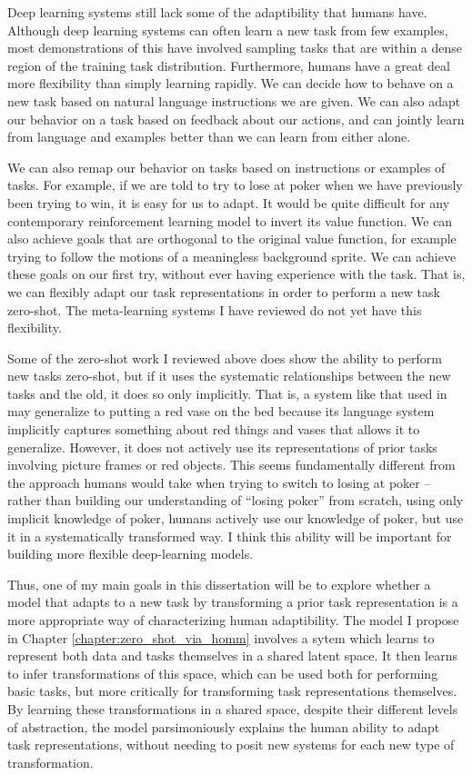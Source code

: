 Deep learning systems still lack some of the adaptibility that humans have. Although deep learning systems can often learn a new task from few examples, most demonstrations of this have involved sampling tasks that are within a dense region of the training task distribution. Furthermore, humans have a great deal more flexibility than simply learning rapidly. We can decide how to behave on a new task based on natural language instructions we are given. We can also adapt our behavior on a task based on feedback about our actions, and can jointly learn from language and examples better than we can learn from either alone. \par
We can also remap our behavior on tasks based on instructions or examples of tasks. For example, if we are told to try to lose at poker when we have previously been trying to win, it is easy for us to adapt. It would be quite difficult for any contemporary reinforcement learning model to invert its value function. We can also achieve goals that are orthogonal to the original value function, for example trying to follow the motions of a meaningless background sprite. We can achieve these goals on our first try, without ever having experience with the task. That is, we can flexibly adapt our task representations in order to perform a new task zero-shot. The meta-learning systems I have reviewed do not yet have this flexibility. \par
Some of the zero-shot work I reviewed above does show the ability to perform new tasks zero-shot, but if it uses the systematic relationships between the new tasks and the old, it does so only implicitly. That is, a system like that used in \citet{Hill2019a} may generalize to putting a red vase on the bed because its language system implicitly captures something about red things and vases that allows it to generalize. However, it does not actively use its representations of prior tasks involving picture frames or red objects. This seems fundamentally different from the approach humans would take when trying to switch to losing at poker -- rather than building our understanding of ``losing poker'' from scratch, using only implicit knowledge of poker, humans actively use our knowledge of poker, but use it in a systematically transformed way. I think this ability will be important for building more flexible deep-learning models. \par
Thus, one of my main goals in this dissertation will be to explore whether a model that adapts to a new task by transforming a prior task representation is a more appropriate way of characterizing human adaptibility. The model I propose in Chapter \ref{chapter:zero_shot_via_homm} involves a sytem which learns to represent both data and tasks themselves in a shared latent space. It then learns to infer transformations of this space, which can be used both for performing basic tasks, but more critically for transforming task representations themselves. By learning these transformations in a shared space, despite their different levels of abstraction, the model parsimoniously explains the human ability to adapt task representations, without needing to posit new systems for each new type of transformation. \par
